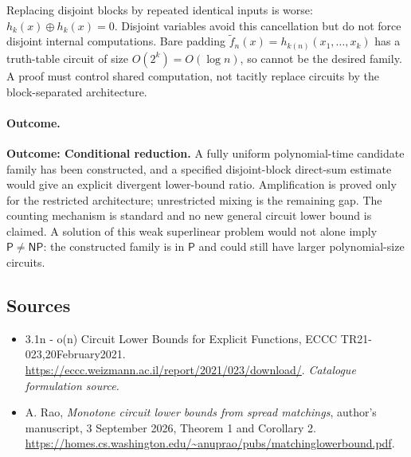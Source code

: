 \documentclass[11pt,a4paper]{article}
\numberwithin{equation}{section}
\begin{document}
Replacing disjoint blocks by repeated identical inputs is worse:
$h_k(x)\oplus h_k(x)=0$. Disjoint variables avoid this cancellation but do
not force disjoint internal computations. Bare padding
$\widetilde f_n(x)=h_{k(n)}(x_1,\ldots,x_k)$ has a truth-table circuit of
size $O(2^k)=O(\log n)$, so cannot be the desired family. A proof must
control shared computation, not tacitly replace circuits by the
block-separated architecture.

\paragraph{Outcome.}
\textbf{Outcome: Conditional reduction.}
A fully uniform polynomial-time candidate family has been constructed, and
a specified disjoint-block direct-sum estimate would give an explicit
divergent lower-bound ratio. Amplification is proved only for the restricted
architecture; unrestricted mixing is the remaining gap. The counting
mechanism is standard and no new general circuit lower bound is claimed.
A solution of this weak superlinear problem would not alone imply
$\mathsf P\ne\mathsf{NP}$: the constructed family is in $\mathsf P$ and
could still have larger polynomial-size circuits.

\subsection{Sources}
\begin{itemize}\raggedright
\item[\textnormal{[S1]}]\hypertarget{source:30006747:1}{} 3.1n - o(n) Circuit Lower Bounds for Explicit Functions, ECCC TR21-023,20February2021.
\url{https://eccc.weizmann.ac.il/report/2021/023/download/}.
{\small\textit{Catalogue formulation source.}}
\item[\textnormal{[E1]}]\hypertarget{extra:30006747:1}{} A. Rao,
\emph{Monotone circuit lower bounds from spread matchings}, author's
manuscript, 3 September 2026, Theorem 1 and Corollary 2.
\url{https://homes.cs.washington.edu/~anuprao/pubs/matchinglowerbound.pdf}.

\end{itemize}
\end{document}
